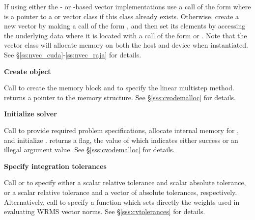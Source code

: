 \begin{Steps}
  If using either the {\cuda}- or {\raja}-based vector implementations
  use a call of the form
   where  is a pointer to a 
  or  vector class if this class already exists.  Otherwise,
  create a new vector
  by making a call of the form , and then set its
  elements by accessing the underlying data where it is located
  with a call of the form
   or .
  Note that the vector class will allocate memory on both the host and device
  when instantiated.  See \S\ref{ss:nvec_cuda}-\ref{ss:nvec_raja} for details.


\item\label{i:cvode_create}
  {\bf Create {\cvode} object}

  Call 
  to create the {\cvode} memory block and to specify the
  linear multistep method.
   returns a pointer to the {\cvode} memory structure.
  See \S\ref{sss:cvodemalloc} for details.

\item\label{i:cvode_malloc}
  {\bf Initialize {\cvode} solver}

  Call 
  to provide required problem specifications, allocate internal memory for
  {\cvode}, and initialize {\cvode}.
   returns a flag, the value of which indicates either success or
  an illegal argument value.  See \S\ref{sss:cvodemalloc} for details.

\item
  {\bf Specify integration tolerances}

  Call  or 
  to specify either a scalar relative tolerance and scalar absolute tolerance, or
  a scalar relative tolerance and a vector of absolute tolerances, respectively.
  Alternatively, call  to specify a function which sets
  directly the weights used in evaluating WRMS vector norms.
  See \S\ref{sss:cvtolerances} for details.


\end{Steps}
